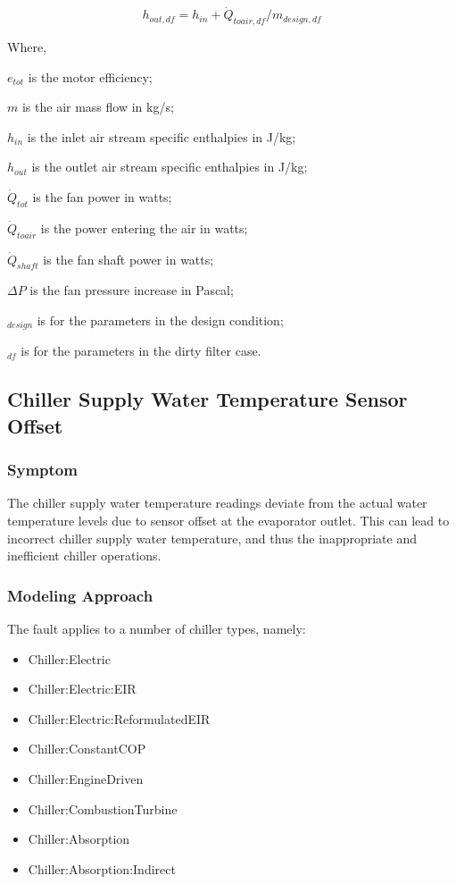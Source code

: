 \begin{equation}
h_{out,df} = h_{in} + \dot{Q}_{toair,df} / m_{design,df}
\end{equation}

Where,

\(e_{tot}\) is the motor efficiency;

\(m\) is the air mass flow in kg/s;

\(h_{in}\) is the inlet air stream specific enthalpies in J/kg;

\(h_{out}\) is the outlet air stream specific enthalpies in J/kg;

\(\dot{Q}_{tot}\) is the fan power in watts;

\(\dot{Q}_{toair}\) is the power entering the air in watts;

\(\dot{Q}_{shaft}\) is the fan shaft power in watts;

\(\Delta P\) is the fan pressure increase in Pascal;

\(_{design}\) is for the parameters in the design condition;

\(_{df}\) is for the parameters in the dirty filter case.


\subsection{Chiller Supply Water Temperature Sensor Offset}\label{chiller-supply-water-temperature-sensor-offset}

\subsubsection{Symptom}

The chiller supply water temperature readings deviate from the actual water temperature levels due to sensor offset at the evaporator outlet. This can lead to incorrect chiller supply water temperature, and thus the inappropriate and inefficient chiller operations.

\subsubsection{Modeling Approach}

The fault applies to a number of chiller types, namely:

\begin{itemize}
\tightlist
\item
  Chiller:Electric
\item
  Chiller:Electric:EIR
\item
  Chiller:Electric:ReformulatedEIR
\item
  Chiller:ConstantCOP
\item
  Chiller:EngineDriven
\item
  Chiller:CombustionTurbine
\item
  Chiller:Absorption
\item
  Chiller:Absorption:Indirect
\end{itemize}

